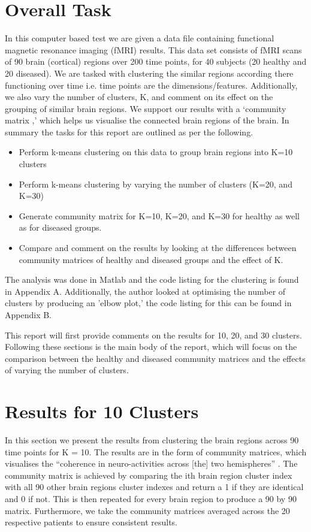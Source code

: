 \section{Overall Task}
In this computer based test we are given a data file containing functional magnetic resonance imaging (fMRI) results. This data set consists of fMRI scans of 90 brain (cortical) regions over 200 time points, for 40 subjects (20 healthy and 20 diseased). We are tasked with clustering the similar regions according there functioning over time i.e. time points are the dimensions/features.  Additionally, we also vary the number of clusters, K, and comment on its effect on the grouping of similar brain regions. We support our results with a `community matrix \cite{BrainRegion},' which helps us visualise the connected brain regions of the brain. In summary the tasks for this report are outlined as per the following.

\begin{itemize}
	\item Perform k-means clustering on this data to group brain regions into K=10 clusters
	\item Perform k-means clustering by varying the number of clusters (K=20, and K=30)
	\item Generate community matrix for K=10, K=20, and K=30 for healthy as well as for
diseased groups.
	\item Compare and comment on the results by looking at the differences between community matrices of healthy and diseased groups and the effect of K.
\end{itemize}

The analysis was done in Matlab and the code listing for the clustering is found in Appendix A. Additionally, the author looked at optimising the number of clusters by producing an 'elbow plot,' the code listing for this can be found in Appendix B.

This report will first provide comments on the results for 10, 20, and 30 clusters. Following these sections is the main body of the report, which will focus on the comparison between the healthy and diseased community matrices and the effects of varying the number of clusters.

\section{Results for 10 Clusters}
In this section we present the results from clustering the brain regions across 90 time points for K = 10. The results are in the form of community matrices, which visualises the ``coherence in neuro-activities across [the] two hemispheres'' \cite{BrainRegion}. The community matrix is achieved by comparing the ith brain region cluster index with all 90 other brain regions cluster indexes and return a 1 if they are identical and 0 if not. This is then repeated for every brain region to produce a 90 by 90 matrix. Furthermore, we take the community matrices averaged across the 20 respective patients to ensure consistent results. 

